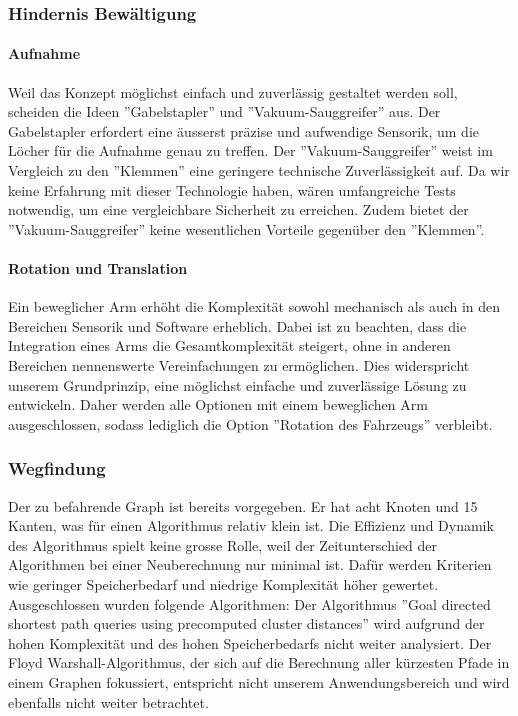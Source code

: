 \documentclass[../main.tex]{subfiles}
\begin{document}
\subsubsection{Hindernis Bewältigung}
    \paragraph{Aufnahme}
    Weil das Konzept möglichst einfach und zuverlässig gestaltet werden soll, scheiden die Ideen ''Gabelstapler'' und ''Vakuum-Sauggreifer'' aus. Der Gabelstapler erfordert eine äusserst präzise und aufwendige Sensorik, um die Löcher für die Aufnahme genau zu treffen. Der ''Vakuum-Sauggreifer'' weist im Vergleich zu den ''Klemmen'' eine geringere technische Zuverlässigkeit auf. Da wir keine Erfahrung mit dieser Technologie haben, wären umfangreiche Tests notwendig, um eine vergleichbare Sicherheit zu erreichen. Zudem bietet der ''Vakuum-Sauggreifer'' keine wesentlichen Vorteile gegenüber den ''Klemmen''.

        
    \paragraph{Rotation und Translation}
    Ein beweglicher Arm erhöht die Komplexität sowohl mechanisch als auch in den Bereichen Sensorik und Software erheblich. Dabei ist zu beachten, dass die Integration eines Arms die Gesamtkomplexität steigert, ohne in anderen Bereichen nennenswerte Vereinfachungen zu ermöglichen. Dies widerspricht unserem Grundprinzip, eine möglichst einfache und zuverlässige Lösung zu entwickeln. Daher werden alle Optionen mit einem beweglichen Arm ausgeschlossen, sodass lediglich die Option ''Rotation des Fahrzeugs'' verbleibt.


\newpage
\subsubsection{Wegfindung}

Der zu befahrende Graph ist bereits vorgegeben. Er hat acht Knoten und 15 Kanten, was 
für einen Algorithmus relativ klein ist. Die Effizienz und Dynamik des Algorithmus spielt keine grosse Rolle, weil der Zeitunterschied der Algorithmen bei einer Neuberechnung nur minimal ist. Dafür werden Kriterien wie geringer Speicherbedarf und niedrige Komplexität höher gewertet. Ausgeschlossen wurden folgende Algorithmen: Der Algorithmus ''Goal directed shortest path queries using precomputed cluster distances'' wird aufgrund der hohen Komplexität und des hohen Speicherbedarfs nicht weiter analysiert. Der Floyd Warshall-Algorithmus, der sich auf die Berechnung aller kürzesten Pfade in einem Graphen fokussiert, entspricht nicht unserem Anwendungsbereich und wird ebenfalls nicht weiter betrachtet.
\end{document}
